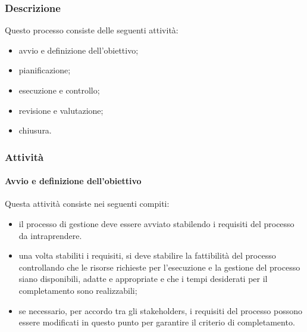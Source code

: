 		\subsubsection{Descrizione}
		Questo processo consiste delle seguenti attività:
		\begin{itemize}
			\item avvio e definizione dell'obiettivo;
			\item pianificazione;
			\item esecuzione e controllo;
			\item revisione e valutazione;
			\item chiusura.
		\end{itemize}
		\subsubsection{Attività}
		\paragraph{Avvio e definizione dell'obiettivo}
		Questa attività consiste nei seguenti compiti:
		\begin{itemize}
			\item il processo di gestione deve essere avviato stabilendo i requisiti del processo da intraprendere.
			\item una volta stabiliti i requisiti, si deve stabilire la fattibilità del processo controllando che le risorse richieste per l'esecuzione e la gestione del processo siano disponibili, adatte e appropriate e che i tempi desiderati per il completamento sono realizzabili;
			\item se necessario, per accordo tra gli stakeholders\glo, i requisiti del processo possono essere modificati in questo punto per garantire il criterio di completamento.
		\end{itemize}

